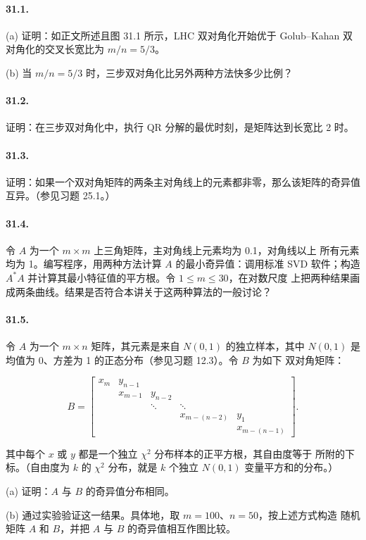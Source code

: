 \documentclass[UTF8,fontset=none,12pt]{ctexart}
\begin{document}
\paragraph{31.1.}
(a) 证明：如正文所述且图 31.1 所示，LHC 双对角化开始优于 Golub--Kahan
双对角化的交叉长宽比为 $m/n=5/3$。

(b) 当 $m/n=5/3$ 时，三步双对角化比另外两种方法快多少比例？

\paragraph{31.2.}
证明：在三步双对角化中，执行 QR 分解的最优时刻，是矩阵达到长宽比 2 时。

\paragraph{31.3.}
证明：如果一个双对角矩阵的两条主对角线上的元素都非零，那么该矩阵的奇异值
互异。（参见习题 25.1。）

\paragraph{31.4.}
令 $A$ 为一个 $m\times m$ 上三角矩阵，主对角线上元素均为 0.1，对角线以上
所有元素均为 1。编写程序，用两种方法计算 $A$ 的最小奇异值：调用标准 SVD
软件；构造 $A^*A$ 并计算其最小特征值的平方根。令 $1\le m\le30$，在对数尺度
上把两种结果画成两条曲线。结果是否符合本讲关于这两种算法的一般讨论？

\paragraph{31.5.}
令 $A$ 为一个 $m\times n$ 矩阵，其元素是来自 $N(0,1)$ 的独立样本，其中
$N(0,1)$ 是均值为 0、方差为 1 的正态分布（参见习题 12.3）。令 $B$ 为如下
双对角矩阵：

$$
B=
\begin{bmatrix}
x_m&y_{n-1}&&&\\
&x_{m-1}&y_{n-2}&&\\
&&\ddots&\ddots&\\
&&&x_{m-(n-2)}&y_1\\
&&&&x_{m-(n-1)}
\end{bmatrix}.
$$

其中每个 $x$ 或 $y$ 都是一个独立 $\chi^2$ 分布样本的正平方根，其自由度等于
所附的下标。（自由度为 $k$ 的 $\chi^2$ 分布，就是 $k$ 个独立 $N(0,1)$
变量平方和的分布。）

(a) 证明：$A$ 与 $B$ 的奇异值分布相同。

(b) 通过实验验证这一结果。具体地，取 $m=100$、$n=50$，按上述方式构造
随机矩阵 $A$ 和 $B$，并把 $A$ 与 $B$ 的奇异值相互作图比较。
\end{document}
